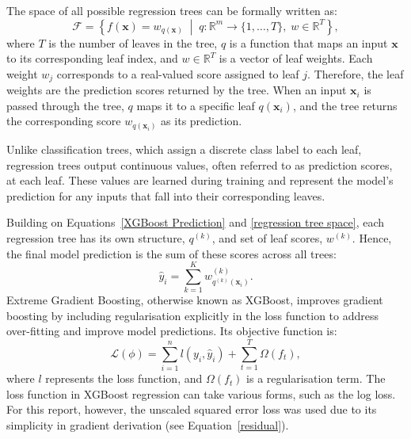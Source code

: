 \documentclass[11pt]{report} %
\begin{document}
The space of all possible regression trees can be formally written as:
\begin{equation}
\mathcal{F} = \left\{ f(\mathbf{x}) = w_{q(\mathbf{x})} \;\middle|\; q : \mathbb{R}^m \rightarrow \{1, \dots, T\}, \; w \in \mathbb{R}^T \right\},
\label{regression tree space}
\end{equation}
where \( T \) is the number of leaves in the tree, \( q \) is a function that maps an input \( \mathbf{x} \) to its corresponding leaf index, and \( w \in \mathbb{R}^T \) is a vector of leaf weights.\cite{chen2016xgboost} Each weight \( w_j \) corresponds to a real-valued score assigned to leaf \( j \). Therefore, the leaf weights are the prediction scores returned by the tree. When an input \( \mathbf{x}_i \) is passed through the tree, \( q \) maps it to a specific leaf \( q(\mathbf{x}_i) \), and the tree returns the corresponding score \( w_{q(\mathbf{x}_i)} \) as its prediction. 

Unlike classification trees, which assign a discrete class label to each leaf, regression trees output continuous values, often referred to as prediction scores, at each leaf. These values are learned during training and represent the model’s prediction for any inputs that fall into their corresponding leaves.


Building on Equations~\ref{XGBoost Prediction} and \ref{regression tree space}, each regression tree has its own structure, \( q^{(k)} \), and set of leaf scores, \( w^{(k)} \).\cite{chen2016xgboost} Hence, the final model prediction is the sum of these scores across all trees:
\[
\hat{y}_i = \sum_{k=1}^K w^{(k)}_{q^{(k)}(\mathbf{x}_i)}.
\]
Extreme Gradient Boosting, otherwise known as XGBoost, improves gradient boosting by including regularisation explicitly in the loss function to address over-fitting and improve model predictions. Its objective function is:
\begin{equation}
    \mathcal{L}(\phi) = \sum_{i=1}^n l(y_i, \hat{y}_i) + \sum_{t=1}^T \Omega(f_t),
    \label{XGBoost Loss}
\end{equation}
where \( l \) represents the loss function, and \( \Omega(f_t) \) is a regularisation term.\cite{chen2016xgboost} The loss function in XGBoost regression can take various forms, such as the log loss. For this report, however, the unscaled squared error loss was used due to its simplicity in gradient derivation (see Equation~\ref{residual}). 
\end{document}

